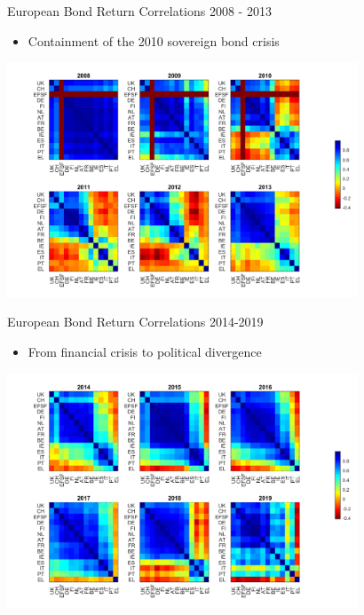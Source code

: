 \documentclass{beamer}
\begin{document}
\begin{frame}{European Bond Return Correlations 2008 - 2013}
\begin{itemize}
\item Containment of the 2010 sovereign bond crisis
\end{itemize}

\includegraphics[height=7cm]{2008-2013}




\end{frame}


\begin{frame}{European Bond Return Correlations 2014-2019}
\begin{itemize}
\item From financial crisis to political divergence 
\end{itemize}

\includegraphics[height=7cm]{2014-2019}



\end{frame}
\end{document}
